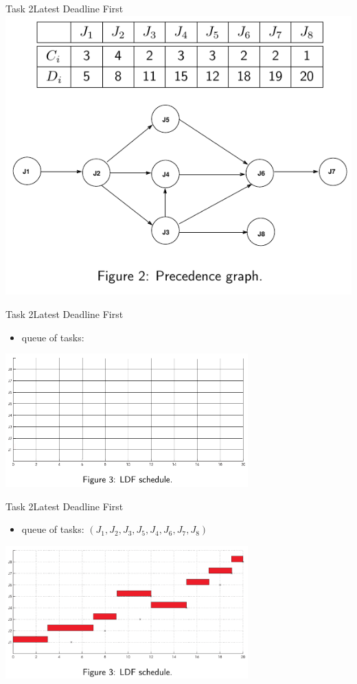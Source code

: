 \begin{frame}{Task 2}{Latest Deadline First}
  \centering
  \includegraphics[height=0.7\paperheight]{./figures/2_tab_graph.png}
\end{frame}

\begin{frame}{Task 2}{Latest Deadline First}
  \begin{itemize}
    \item \alert{queue of tasks:}
  \end{itemize}
  \centering
  \includegraphics[width=0.7\textwidth]{./figures/2_empty.png}
\end{frame}

\begin{frame}{Task 2}{Latest Deadline First}
  \begin{itemize}
    \item \alert{queue of tasks:}  $(J_1, J_2, J_3, J_5, J_4, J_6, J_7, J_8)$
  \end{itemize}
  \centering
  \includegraphics[width=0.7\textwidth]{./figures/2_sol.png}
\end{frame}
